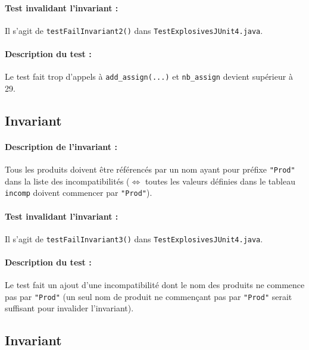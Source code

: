 \documentclass{article}
\begin{document}
\vspace{-0.2cm}
\paragraph{Test invalidant l'invariant :} Il s'agit de \texttt{testFailInvariant2()} dans \texttt{TestExplosivesJUnit4.java}.

\vspace{-0.2cm}
\paragraph{Description du test :} Le test fait trop d'appels à \texttt{add\_assign(...)} et \texttt{nb\_assign} devient supérieur à 29. 

\subsection{Invariant }

\paragraph{Description de l'invariant :} Tous les produits doivent être référencés par un nom ayant pour préfixe \texttt{"Prod"} dans la liste des incompatibilités ($\Leftrightarrow$ toutes les valeurs définies dans le tableau \texttt{incomp} doivent commencer par \texttt{"Prod"}).

\vspace{-0.2cm}
\paragraph{Test invalidant l'invariant :} Il s'agit de \texttt{testFailInvariant3()} dans \texttt{TestExplosivesJUnit4.java}.

\vspace{-0.2cm}
\paragraph{Description du test :} Le test fait un ajout d'une incompatibilité dont le nom des produits ne commence pas par \texttt{"Prod"} (un seul nom de produit ne commençant pas par \texttt{"Prod"} serait suffisant pour invalider l'invariant).

\subsection{Invariant }
\end{document}
